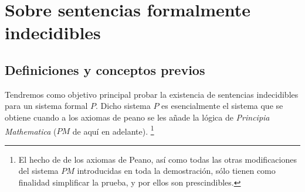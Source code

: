 \chapter{Sobre sentencias formalmente indecidibles}


\section{Definiciones y conceptos previos}
Tendremos como objetivo principal probar la existencia de sentencias indecidibles para un sistema formal $P$. Dicho sistema $P$ es
esencialmente el sistema que se obtiene cuando a los axiomas de peano se les añade la lógica de \textit{Principia Mathematica} ($PM$ de aquí en adelante).
\footnote{El hecho de de los axiomas de Peano, así como todas las otras modificaciones del sistema $PM$ introducidas en toda la demostración, sólo 
tienen como finalidad simplificar la prueba, y por ellos son prescindibles.}

